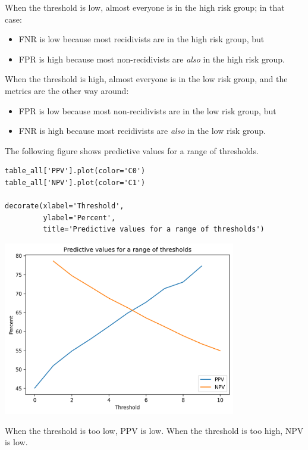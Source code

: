 When the threshold is low, almost everyone is in the high risk group; in
that case:

\begin{itemize}
\item
  FNR is low because most recidivists are in the high risk group, but
\item
  FPR is high because most non-recidivists are \emph{also} in the high
  risk group.
\end{itemize}

When the threshold is high, almost everyone is in the low risk group,
and the metrics are the other way around:

\begin{itemize}
\item
  FPR is low because most non-recidivists are in the low risk group, but
\item
  FNR is high because most recidivists are \emph{also} in the low risk
  group.
\end{itemize}

The following figure shows predictive values for a range of thresholds.

\begin{lstlisting}[]
table_all['PPV'].plot(color='C0')
table_all['NPV'].plot(color='C1')

decorate(xlabel='Threshold', 
         ylabel='Percent',
         title='Predictive values for a range of thresholds')
\end{lstlisting}

\begin{center}
\includegraphics[width=4in]{chapters/02_calibration_files/02_calibration_38_0.png}
\end{center}

When the threshold is too low, PPV is low. When the threshold is too
high, NPV is low.

